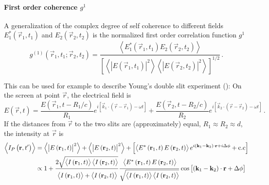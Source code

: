 \paragraph{First order coherence $g^1$}
A generalization of the complex degree of self coherence to different fields  $E_1^*(\vec{r}_1,t_1)$ and $E_2(\vec{r}_2,t_2)$ is the normalized first order correlation function $g^1$ \cite{agarwal2013}
\begin{equation}
	g^{(1)}(\vec{r}_1,t_1;\vec{r}_2,t_2)= \frac
	{\left< E_1^*(\vec{r}_1,t_1)E_2(\vec{r}_2,t_2) \right>}
	{\left[ \left<\left | E(\vec{r}_1,t_1)\right |^2 \right> \left< \left |E(\vec{r}_2,t_2)\right |^2 \right>\right]^{1/2}}	\,.
\end{equation}



This can be used for example to describe Young's double slit experiment (): On the screen at point $\vec{r}$, the electrical field is 
\begin{equation}
	E(\vec{r}, t)=\frac{E\left(\vec{r}_{1}, t-R_{1} / c\right)}{R_{1}} e^{i\left[\vec{k}_{1} \cdot\left(\vec{r}-\vec{r}_{1}\right)-\omega t\right]}+\frac{E\left(\vec{r}_{2}, t-R_{2} / c\right)}{R_{2}} e^{i\left[\vec{k}_{2} \cdot\left(\vec{r}-\vec{r}_{2}\right)-\omega t\right]} \,.
\end{equation}
If the distances from $\vec{r}$ to the two slits are (approximately) equal, $R_{1}\approx R_{2} \approx d$, the intensity at $\vec{r}$ is
\begin{align*}
	\left\langle I_{P}\left(\vec{r}, t^{\prime}\right)\right\rangle&=\left\langle\left|E\left(\vec{r}_{1}, t\right)\right|^{2}\right\rangle+\left\langle\left|E\left(\vec{r}_{2}, t\right)\right|^{2}\right\rangle 
	+\left[\left\langle E^{*}\left(\vec{r}_{1}, t\right) E\left(\vec{r}_{2}, t\right)\right\rangle e^{i\left(\vec{k}_{1}-\vec{k}_{2}\right) \cdot \vec{r}+i \Delta \phi}+\text{c.c}\right] \\
	& \propto 1+
	\frac{2 \sqrt{\left< I\left(\vec{r}_{1}, t\right)\right>\left< I\left(\vec{r}_{2}, t\right)\right>}}
	{\vphantom{2\sqrt{\left<I\left(\vec{r}_{1}\right)\right>}}\left< I\left(\vec{r}_{1}, t\right)\right>+\left< I\left(\vec{r}_{2}, t\right)\right>}	
	\frac{\vphantom{2\sqrt{\left<I\left(\vec{r}_{1}\right)\right>}}\left< E^{*}\left(\vec{r}_{1}, t\right) E\left(\vec{r}_{2}, t\right)\right>}
	{\vphantom{2\sqrt{\left<I\left(\vec{r}_{1}\right)\right>}}\sqrt{\left\langle I\left(\vec{r}_{1}, t\right)\right>\left\langle I\left(\vec{r}_{2}, t\right)\right>}}
	\cos \left[\left(\vec{k}_{1}-\vec{k}_{2}\right) \cdot \vec{r}+\Delta \phi\right]
\end{align*}


